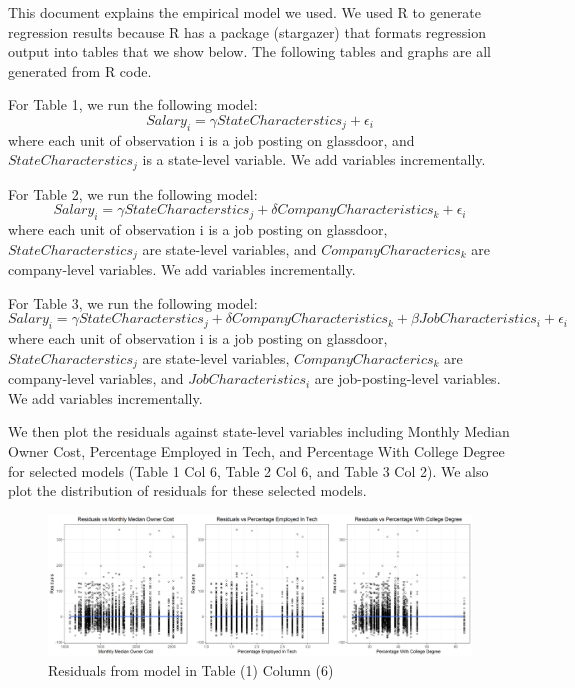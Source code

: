 \documentclass{article}
\begin{document}
	
This document explains the empirical model we used. We used R to generate regression results because R has a package (stargazer) that formats regression output into tables that we show below. The following tables and graphs are all generated from R code.

\bigskip

For Table 1, we run the following model:
$$
Salary_i = \gamma StateCharacterstics_j + \epsilon_i
$$
where each unit of observation i is a job posting on glassdoor, and $StateCharacterstics_j$ is a state-level variable. We add variables incrementally.

\bigskip \bigskip

For Table 2, we run the following model:
$$
Salary_i = \gamma StateCharacterstics_j + \delta CompanyCharacteristics_k + \epsilon_i
$$
where each unit of observation i is a job posting on glassdoor, $StateCharacterstics_j$ are state-level variables, and $CompanyCharacterics_k$ are company-level variables. We add variables incrementally.

\bigskip \bigskip

For Table 3, we run the following model:
$$
Salary_i = \gamma StateCharacterstics_j + \delta CompanyCharacteristics_k + \beta JobCharacteristics_i + \epsilon_i
$$
where each unit of observation i is a job posting on glassdoor, $StateCharacterstics_j$ are state-level variables, $CompanyCharacterics_k$ are company-level variables, and $JobCharacteristics_i$ are job-posting-level variables. We add variables incrementally.

\bigskip\bigskip
We then plot the residuals against state-level variables including Monthly Median Owner Cost, Percentage Employed in Tech, and Percentage With College Degree for selected models (Table 1 Col 6, Table 2 Col 6, and Table 3 Col 2). We also plot the distribution of residuals for these selected models.
	
	
	\begin{landscape}
		
	\end{landscape}

	\begin{landscape}
		
	\end{landscape}

	
	
	\begin{figure}[h]
	\caption{Residuals from model in Table (1) Column (6)}
	\centering
	\includegraphics[width=\textwidth]{residuals_check1.png}
	\end{figure}
\end{document}
